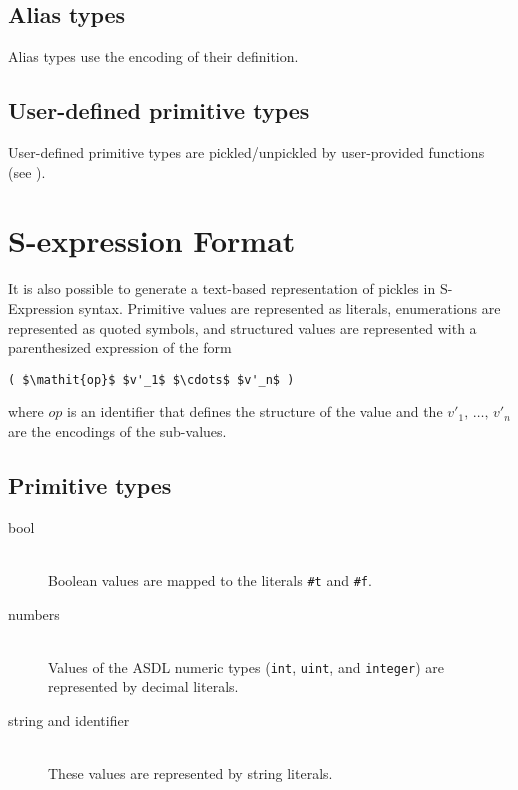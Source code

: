 \subsection{Alias types}
Alias types use the encoding of their definition.

\subsection{User-defined primitive types}
User-defined primitive types are pickled/unpickled by user-provided functions (see
).

\section{S-expression Format}
\label{sec:s-expressions}
It is also possible to generate a text-based representation of pickles in S-Expression
syntax.  Primitive values are represented as literals, enumerations are represented
as quoted symbols, and structured values are represented with a parenthesized
expression of the form
\begin{code}\begin{lstlisting}[mathescape=true]
( $\mathit{op}$ $v'_1$ $\cdots$ $v'_n$ )
\end{lstlisting}\end{code}%
where $\mathit{op}$ is an identifier that defines the structure of the value
and the $v'_1,\,\ldots,\,v'_n$ are the encodings of the sub-values.

\subsection{Primitive types}

\begin{description}
  \item[bool] \mbox{}\\
    Boolean values are mapped to the literals \lstinline!#t! and \lstinline!#f!.
    
  \item[numbers] \mbox{}\\
    Values of the ASDL numeric types (\lstinline!int!, \lstinline!uint!, and
    \lstinline!integer!) are represented by decimal literals.

  \item[string and identifier] \mbox{}\\
    These values are represented by string literals.
\end{description}%

